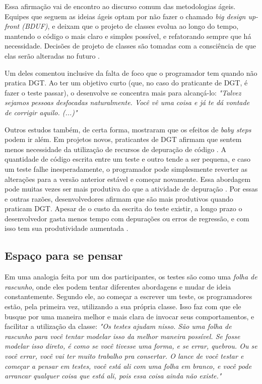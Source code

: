 Essa afirmação vai de encontro ao discurso comum das metodologias ágeis.
Equipes que seguem as ideias ágeis optam por não fazer o chamado \textit{big design up-front (BDUF)},
e deixam que o projeto de classes evolua ao longo do tempo, mantendo o código o mais claro e
simples possível, e refatorando sempre que há necessidade. Decisões de
projeto de classes são tomadas com a consciência de que elas serão alteradas no futuro
\cite{is-design-dead}.

Um deles comentou inclusive da falta de foco que o programador tem quando não pratica DGT.
Ao ter um objetivo curto (que, no caso do praticante de DGT, é fazer o teste passar), o
desenvolve se concentra mais para alcançá-lo:
\textit{"Talvez sejamos pessoas desfocadas naturalmente. Você vê uma coisa e já te dá vontade
de corrigir aquilo. (...)"}

Outros estudos também, de certa forma, mostraram que os efeitos de \textit{baby steps}
podem ir além.
Em projetos novos, praticantes de DGT afirmam que sentem menos necessidade da
utilização de recursos de depuração de código \cite{george-williams-experiment} 
\cite{janzen-arch-improvement}. 
A quantidade de código
escrita entre um teste e outro tende a ser pequena, e caso um teste falhe
inesperadamente, o programador pode simplesmente reverter as alterações para a 
versão anterior estável e começar novamente. Essa abordagem pode muitas vezes
ser mais produtiva do que a atividade de depuração 
\cite{janzen-arch-improvement}. Por essas e outras razões, desenvolvedores afirmam 
que são mais produtivos quando praticam DGT. Apesar de o custo da escrita do teste
existir, a longo prazo o desenvolvedor gasta menos tempo com depurações ou 
erros de regressão, e com isso tem sua produtividade aumentada
\cite{george-e-williams}.

\subsection{Espaço para se pensar}

Em uma analogia feita por um dos participantes, os testes são como uma 
\textit{folha de rascunho}, 
onde eles podem tentar diferentes abordagens e mudar de ideia constantemente. Segundo ele,
ao começar a escrever um teste, os programadores estão, pela primeira vez, utilizando a sua 
própria classe. Isso faz com que ele busque por uma maneira melhor e mais clara de invocar
seus comportamentos, e facilitar a utilização da classe:
\textit{"Os testes ajudam nisso. São uma folha de rascunho para você tentar modelar
isso da melhor maneira possível. Se fosse modelar isso direto, é como se você tivesse
uma forma, e se errar, quebrou. Ou se você errar, você vai ter muito trabalho pra consertar.
O lance de você testar e começar a pensar em testes, você está ali com uma folha em branco,
e você pode arrancar qualquer coisa que está ali, pois essa coisa ainda não existe."}

